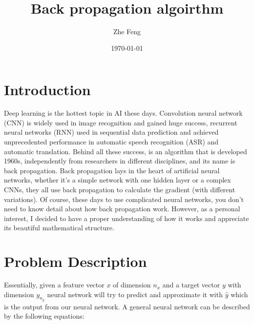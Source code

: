 \documentclass{article} [10pt] %
\title{Back propagation algoirthm}
\author{Zhe Feng}
\date{\today}
\begin{document}
\noindent
\maketitle
\section{Introduction}
Deep learning is the hottest topic in AI these days. Convolution neural network (CNN) is widely used in image recognition and gained huge success, recurrent neural networks (RNN) used in sequential data prediction and achieved unprecedented performance in automatic speech recognition (ASR) and automatic translation. Behind all these success, is an algorithm that is developed 1960s, independently from researchers in different disciplines, and its name is back propagation.
Back propagation lays in the heart of artificial neural networks, whether it's a simple network with one hidden layer or a complex CNNs, they all use back propagation to calculate the gradient (with different variations). Of course, these days to use complicated neural networks, you don't need to know detail about how back propagation work. However, as a personal interest, I decided to have a proper understanding of how it works and appreciate its beautiful mathematical structure.


\section{Problem Description}	\label{sec:problem_ddescription}
Essentially, given a feature vector $x$ of dimension $n_x$ and a target vector $y$ with dimension $y_{n_y}$ neural network will try to predict and approximate it with $\hat{y}$ which is the output from our neural network. A general neural network can be described by the following equations:
\end{document}
